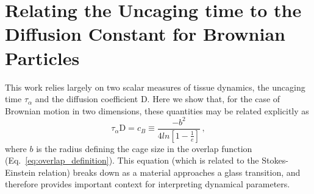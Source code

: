 \documentclass[
reprint
,aps
,amssymb
,amsmath
,superscriptaddress
]{revtex4-1}
\begin{document}

\section{Relating the Uncaging time to the Diffusion Constant for Brownian Particles\label{app:tau_diff_relation}}

This work relies largely on two scalar measures of tissue dynamics, the uncaging time $\tau_\alpha$ and the diffusion coefficient $\mathrm{D}$. Here we show that, for the case of Brownian motion in two dimensions, these quantities may be related explicitly as
%
\begin{equation}\label{eq:app_tau_diff_relation}
\tau_\alpha \mathrm{D} = c_B \equiv \frac{- b^2}{ 4 ln[1 - \frac{1}{e}]} \, ,
\end{equation}
%
where $b$ is the radius defining the cage size in the overlap function (Eq.~\ref{eq:overlap_definition}). This equation (which is related to the Stokes-Einstein relation) breaks down as a material approaches a glass transition, and therefore provides important context for interpreting dynamical parameters. 
\end{document}
